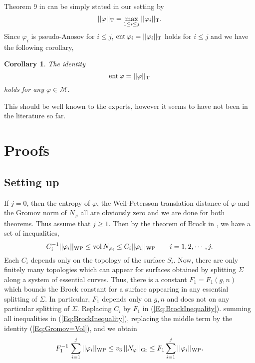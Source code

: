 \documentclass[11pt,reqno]{amsart}
\newtheorem{corollary}[theorem]{{\bf Corollary}}
\numberwithin{equation}{section}
\begin{document}
Theorem 9 in \cite{Bers} can be simply stated in our setting by  
\begin{equation*}
	|| \varphi ||_{{\rm T}} = \max_{1 \leq i \leq j} || \varphi_i ||_{{\rm T}}.  
\end{equation*}
Since  $\varphi_i$ is pseudo-Anosov for  $i \leq j$, 
${\rm ent} \, \varphi_i = || \varphi_i ||_{{\rm T}}$  holds for  $ i \leq j$     
and we have the following corollary,  
\begin{corollary}\label{Cor:Entropy=T} 
The identity 
\begin{equation*}
	{\rm ent} \, \varphi = || \varphi ||_{{\rm T}}
\end{equation*}
holds for any  $\varphi \in \mathcal{M}$. 
\end{corollary} 
\noindent
This should be well known to the experts, 
however it seems to have not been in the literature so far.  

\section{Proofs} 

\subsection{Setting up}\label{Subsection:3.1} 

If  $j = 0$, 
then the entropy of  $\varphi$, 
the Weil-Petersson translation distance of  $\varphi$  and the Gromov norm  of  $N_{\varphi}$  
all are obviously zero and we are done for both theorems.  
Thus assume that  $j \geq 1$.  
Then by the theorem of Brock in  \cite{Brock},   
we have a set of inequalities, 
\begin{equation}\label{Eq:BrockInequality}
	C_i^{-1} || \varphi_i ||_{{\rm WP}} \leq {\rm vol} \, N_{\varphi_i} 
		\leq C_i || \varphi_i ||_{{\rm WP}}  \qquad i = 1, 2, \cdots, j. 
\end{equation} 
Each  $C_i$  depends only on the topology of the surface  $S_i$.  
Now, 
there are only finitely many topologies which can appear for 
surfaces obtained by splitting  $\varSigma$  along a system of 
essential curves.  
Thus, 
there is a constant  $F_1= F_1(g, n)$  which bounds the Brock constant 
for a surface appearing in any essential splitting of  $\varSigma$.  
In particular,  
$F_1$  depends only on  $g, n$  and does not on any particular splitting of  $\varSigma$.  
Replacing  $C_i$  by  $F_1$  in (\ref{Eq:BrockInequality}).    
summing all inequalities in  (\ref{Eq:BrockInequality}),   
replacing the middle term by the identity  (\ref{Eq:Gromov=Vol}), 
and we obtain 
\begin{equation}\label{Eq:Comparison1}
	F_1^{-1} \, \sum_{i = 1}^j || \varphi_i ||_{{\rm WP}} 
	\leq v_3 \, || N_{\varphi} ||_{{\rm Gr}} 
	\leq F_1 \sum_{i=1}^j ||\varphi_i ||_{{\rm WP}}.  
\end{equation}  
\end{document}
